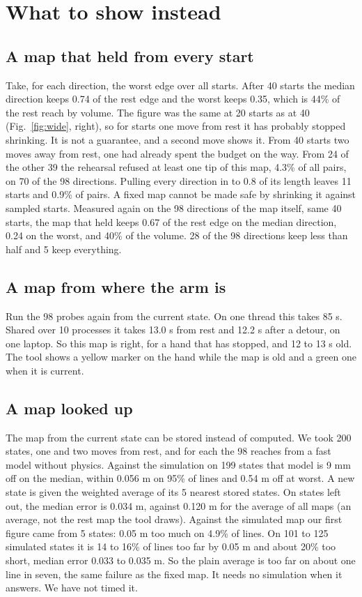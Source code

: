 \documentclass[pdflatex,sn-mathphys-num]{sn-jnl}
\begin{document}
\section{What to show instead}
\subsection{A map that held from every start}
Take, for each direction, the worst edge over all starts. After 40 starts the median direction keeps 0.74 of the
rest edge and the worst keeps 0.35, which is 44\% of the rest reach by volume. The figure was the same at 20
starts as at 40 (Fig.~\ref{fig:wide}, right), so for starts one move from rest it has probably stopped
shrinking. %
It is not a guarantee, and a second move shows it. From 40 starts two moves away from rest, one had already
spent the budget on the way. From 24 of the other 39 the rehearsal refused at least one tip of this map, 4.3\% of
all pairs, on 70 of the 98 directions. Pulling every direction in to 0.8 of its length leaves 11 starts and
0.9\% of pairs. A fixed map cannot be made safe by shrinking it against sampled starts. %
Measured again on the 98 directions of the map itself, same 40 starts, the map that held keeps 0.67 of the
rest edge on the median direction, 0.24 on the worst, and 40\% of the volume. 28 of the 98 directions keep
less than half and 5 keep everything. %

\subsection{A map from where the arm is}
Run the 98 probes again from the current state. On one thread this takes 85 s. Shared over 10 processes it takes
13.0 s from rest and 12.2 s after a detour, on one laptop. %
So this map is right, for a hand that has stopped, and 12 to 13 s old. The tool shows a yellow marker on the hand
while the map is old and a green one when it is current.

\subsection{A map looked up}
The map from the current state can be stored instead of computed. We took 200 states, one and two moves from rest,
and for each the 98 reaches from a fast model without physics. Against the simulation on 199 states that model
is 9 mm off on the median, within 0.056 m on 95\% of lines and 0.54 m off at worst.
A new state is given the weighted average of its 5 nearest stored states. On states left out, the median error is
0.034 m, against 0.120 m for the average of all maps (an average, not the rest map the tool draws). Against the
simulated map our first figure came from 5 states: 0.05 m too much on 4.9\% of lines. On 101 to 125 simulated states
it is 14 to 16\% of lines too far by 0.05 m and about 20\% too short, median error 0.033 to 0.035 m. So the plain
average is too far on about one line in seven, the same failure as the fixed map. It needs no simulation when it
answers. We have not timed it. %
\end{document}
